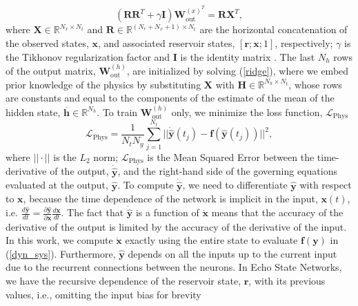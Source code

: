 \documentclass[runningheads]{llncs}
\begin{document}
\begin{equation}
\label{ridge}
    \left(\mathbf{R}\mathbf{R}^T + \gamma \mathbf{I}\right)\mathbf{W}_{\mathrm{out}}^{(x)^{T}} 
    =\mathbf{R}\mathbf{X}^T,
\end{equation}
where $\mathbf{X}\in\mathbb{R}^{N_{x}\times N_{t}}$ and $\mathbf{R}\in\mathbb{R}^{(N_{r}+N_x+1)\times N_{t}}$ are the horizontal concatenation of the observed states, $\mathbf{x}$, and associated reservoir states, $[\mathbf{r};\mathbf{x};1]$, respectively; $\gamma$ is the Tikhonov regularization factor and $\mathbf{I}$ is the identity matrix \cite{lukovsevivcius2012practical}. The last $N_h$ rows of the output matrix, $\mathbf{W}_{\mathrm{out}}^{(h)}$, are initialized by solving (\ref{ridge}), where we embed prior knowledge of the physics by substituting $\mathbf{X}$ with $\mathbf{H}\in\mathbb{R}^{N_{h}\times N_{t}}$, whose rows are constants and equal to the components of the estimate of the mean of the hidden state, $\mathbf{\overline{h}}\in\mathbb{R}^{N_h}$. 
To train $\mathbf{W}_{\mathrm{out}}^{(h)}$ only, we minimize the loss function, $\mathcal{L}_{\mathrm{Phys}}$
\begin{equation}
\mathcal{L}_{\mathrm{Phys}} = \frac{1}{N_tN_y}\sum_{j=1}^{N_t}||\mathbf{\dot{\hat{y}}}(t_j)-\textbf{f}(\mathbf{\hat{y}}(t_j))||^2, \label{l_phys}
\end{equation}
where $||\cdot||$ is the $L_2$ norm; 
$\mathcal{L}_{\mathrm{Phys}}$ is the Mean Squared Error between the time-derivative of the output, $\mathbf{\dot{\hat{y}}}$, and the right-hand side of the governing equations evaluated at the output, $\mathbf{\hat{y}}$.
To compute $\mathbf{\dot{\hat{y}}}$, we need to differentiate $\mathbf{\hat{y}}$ with respect to $\mathbf{x}$, because the time dependence of the network is implicit in the input, $\mathbf{x}(t)$, i.e. $\frac{d\mathbf{\hat{y}}}{dt} = \frac{\partial\mathbf{\hat{y}}}{\partial \mathbf{x}}\frac{d\mathbf{x}}{dt}$. The fact that $\mathbf{\dot{\hat{y}}}$ is a function of $\mathbf{\dot{x}}$ means that the accuracy of the derivative of the output is limited by the accuracy of the derivative of the input. In this work, we compute $\mathbf{\dot{x}}$ exactly using the entire state to evaluate $\mathbf{f}(\mathbf{y})$ in (\ref{dyn_sys}). Furthermore, $\mathbf{\hat{y}}$ depends on all the inputs up to the current input due to the recurrent connections between the neurons. In Echo State Networks, we have the recursive dependence of the reservoir state, $\mathbf{r}$, with its previous values, i.e.,  omitting the input bias for brevity
\end{document}
